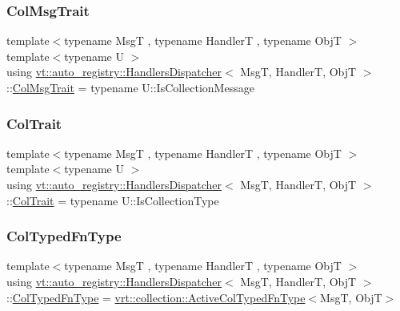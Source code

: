 \subsubsection{\texorpdfstring{Col\+Msg\+Trait}{ColMsgTrait}}
{\footnotesize\ttfamily template$<$typename MsgT , typename HandlerT , typename ObjT $>$ \\
template$<$typename U $>$ \\
using \hyperlink{structvt_1_1auto__registry_1_1_handlers_dispatcher}{vt\+::auto\+\_\+registry\+::\+Handlers\+Dispatcher}$<$ MsgT, HandlerT, ObjT $>$\+::\hyperlink{structvt_1_1auto__registry_1_1_handlers_dispatcher_aa2e8b80baa4dffdd9b2476ca9d2a7b46}{Col\+Msg\+Trait} =  typename U\+::\+Is\+Collection\+Message}

\mbox{\label{structvt_1_1auto__registry_1_1_handlers_dispatcher_a0d707c7f0650f1185b5628aa71a98c87}} 
\subsubsection{\texorpdfstring{Col\+Trait}{ColTrait}}
{\footnotesize\ttfamily template$<$typename MsgT , typename HandlerT , typename ObjT $>$ \\
template$<$typename U $>$ \\
using \hyperlink{structvt_1_1auto__registry_1_1_handlers_dispatcher}{vt\+::auto\+\_\+registry\+::\+Handlers\+Dispatcher}$<$ MsgT, HandlerT, ObjT $>$\+::\hyperlink{structvt_1_1auto__registry_1_1_handlers_dispatcher_a0d707c7f0650f1185b5628aa71a98c87}{Col\+Trait} =  typename U\+::\+Is\+Collection\+Type}

\mbox{\label{structvt_1_1auto__registry_1_1_handlers_dispatcher_ad45c828eebdd2a18ffc0aa64f542a85c}} 
\subsubsection{\texorpdfstring{Col\+Typed\+Fn\+Type}{ColTypedFnType}}
{\footnotesize\ttfamily template$<$typename MsgT , typename HandlerT , typename ObjT $>$ \\
using \hyperlink{structvt_1_1auto__registry_1_1_handlers_dispatcher}{vt\+::auto\+\_\+registry\+::\+Handlers\+Dispatcher}$<$ MsgT, HandlerT, ObjT $>$\+::\hyperlink{structvt_1_1auto__registry_1_1_handlers_dispatcher_ad45c828eebdd2a18ffc0aa64f542a85c}{Col\+Typed\+Fn\+Type} =  \hyperlink{namespacevt_1_1vrt_1_1collection_a939327f58a5838cf9d7dcc7f14d1670c}{vrt\+::collection\+::\+Active\+Col\+Typed\+Fn\+Type}$<$MsgT, ObjT$>$}

